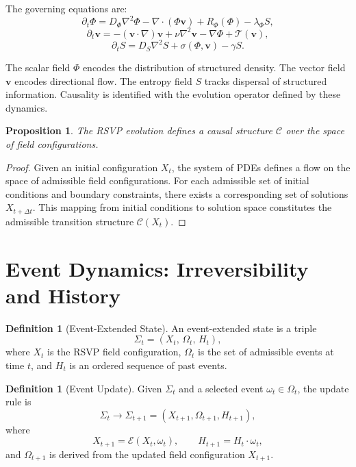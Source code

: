 \documentclass[11pt,a4paper]{article}
\newtheorem{proposition}[theorem]{Proposition}
\theoremstyle{definition}
\newtheorem{definition}[theorem]{Definition}
\theoremstyle{remark}
\begin{document}
The governing equations are:
\begin{equation}
\partial_t \Phi = D_\Phi \nabla^2 \Phi - \nabla \cdot (\Phi \mathbf{v}) + R_\Phi(\Phi) - \lambda_\Phi S,
\end{equation}
\begin{equation}
\partial_t \mathbf{v} = -(\mathbf{v} \cdot \nabla)\mathbf{v} + \nu \nabla^2 \mathbf{v} - \nabla \Phi + \mathcal{T}(\mathbf{v}),
\end{equation}
\begin{equation}
\partial_t S = D_S \nabla^2 S + \sigma(\Phi, \mathbf{v}) - \gamma S.
\end{equation}

The scalar field $\Phi$ encodes the distribution of structured density. The vector field $\mathbf{v}$ encodes directional flow. The entropy field $S$ tracks dispersal of structured information. Causality is identified with the evolution operator defined by these dynamics.

\begin{proposition}
The RSVP evolution defines a causal structure $\mathcal{C}$ over the space of field configurations.
\end{proposition}

\begin{proof}
Given an initial configuration $X_t$, the system of PDEs defines a flow on the space of admissible field configurations. For each admissible set of initial conditions and boundary constraints, there exists a corresponding set of solutions $X_{t+\Delta t}$. This mapping from initial conditions to solution space constitutes the admissible transition structure $\mathcal{C}(X_t)$.
\end{proof}

\section{Event Dynamics: Irreversibility and History}

\begin{definition}[Event-Extended State]
An event-extended state is a triple
\[
\Sigma_t = (X_t,\, \Omega_t,\, H_t),
\]
where $X_t$ is the RSVP field configuration, $\Omega_t$ is the set of admissible events at time $t$, and $H_t$ is an ordered sequence of past events.
\end{definition}

\begin{definition}[Event Update]
Given $\Sigma_t$ and a selected event $\omega_t \in \Omega_t$, the update rule is
\[
\Sigma_t \rightarrow \Sigma_{t+1} = (X_{t+1}, \Omega_{t+1}, H_{t+1}),
\]
where
\[
X_{t+1} = \mathcal{E}(X_t, \omega_t), \qquad H_{t+1} = H_t \cdot \omega_t,
\]
and $\Omega_{t+1}$ is derived from the updated field configuration $X_{t+1}$.
\end{definition}
\end{document}
